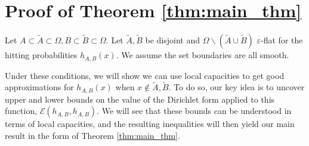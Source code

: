 \documentclass[english, aip, jcp, priprint, graphicx,floatfix]{revtex4-1}
\theoremstyle{plain}
\theoremstyle{definition}
\theoremstyle{plain}
\begin{document}
\section{Proof of Theorem \ref{thm:main_thm}}\label{sec:proof_thm}

Let $A\subset\tilde A\subset\Omega,B\subset\tilde B\subset\Omega$.  Let $\tilde A,\tilde B$ be disjoint and $\Omega \backslash (\tilde A \cup \tilde B)$ $\varepsilon$-flat for the hitting probabilities $h_{A,B}(x)$.  We assume the set boundaries are all smooth.  

Under these conditions, we will show we can use local capacities to get good approximations for $h_{A,B}(x)$ when $x\notin \tilde A,\tilde B$.  To do so, our key idea is to uncover upper and lower bounds on the value of the Dirichlet form applied to this function, $\mathcal{E}(h_{A,B},h_{A,B})$.  We will see that these bounds can be understood in terms of local capacities, and the resulting inequalities will then yield our main result in the form of Theorem \ref{thm:main_thm}.
\end{document}
